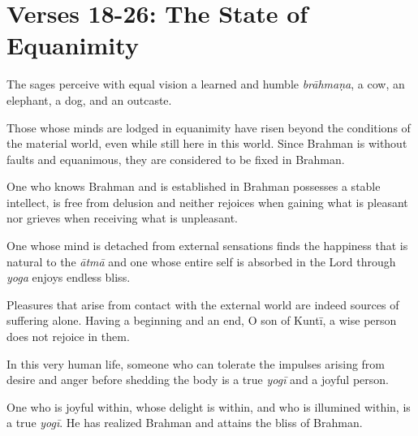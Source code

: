 \section{Verses 18-26: The State of Equanimity}\label{sec-verses-18-26-the-state-of-equanimity}

{The sages perceive with equal vision a learned and humble \textit{brāhmaṇa}, a cow, an elephant, a dog, and an outcaste.}

{Those whose minds are lodged in equanimity have risen beyond the conditions of the material world, even while still here in this world. Since Brahman is without faults and equanimous, they are considered to be fixed in Brahman.}

{One who knows Brahman and is established in Brahman possesses a stable intellect, is free from delusion and neither rejoices when gaining what is pleasant nor grieves when receiving what is unpleasant.}

{One whose mind is detached from external sensations finds the happiness that is natural to the \textit{ātmā} and one whose entire self is absorbed in the Lord through \textit{yoga} enjoys endless bliss.}

{Pleasures that arise from contact with the external world are indeed sources of suffering alone. Having a beginning and an end, O son of Kuntī, a wise person does not rejoice in them.}

{In this very human life, someone who can tolerate the impulses arising from desire and anger before shedding the body is a true \textit{yogī} and a joyful person.}

{One who is joyful within, whose delight is within, and who is illumined within, is a true \textit{yogī}. He has realized Brahman and attains the bliss of Brahman.}

